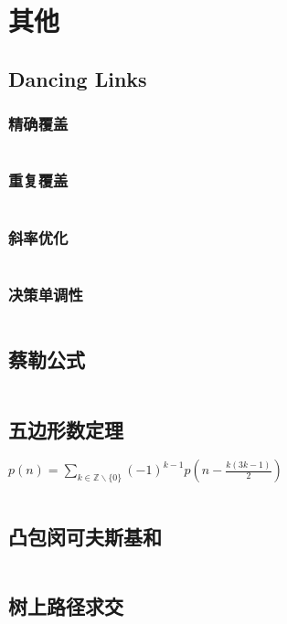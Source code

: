 \section{其他}
\subsection{Dancing Links}
\subsubsection{精确覆盖}
\inputminted{cpp}{\source/others/exact.cpp}
\subsubsection{重复覆盖}
\inputminted{cpp}{\source/others/rader.cpp}
\subsubsection{斜率优化}
\inputminted{cpp}{\source/others/optimize.cpp}
\subsubsection{决策单调性}
\inputminted{cpp}{\source/others/dicision.cpp}
\subsection{蔡勒公式}
\inputminted{cpp}{\source/others/zellers-congruence.cpp}
\subsection{五边形数定理}
$p(n) = \sum_{k \in \mathbb{Z} \backslash \{0\}} (-1)^{k - 1}p(n - \frac{k(3k-1)}{2})$
\inputminted{cpp}{\source/others/partition.cpp}
\subsection{凸包闵可夫斯基和}
\inputminted{cpp}{\source/others/mink.cpp}
\subsection{树上路径求交}
\inputminted{cpp}{\source/others/path-intersection.cpp}
